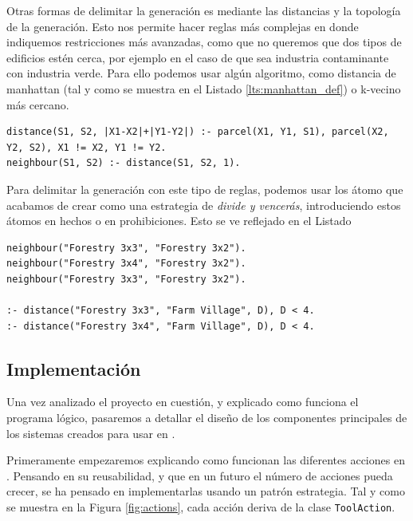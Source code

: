 Otras formas de delimitar la generación es mediante las distancias y la topología de la generación. Esto nos permite hacer reglas más complejas en donde indiquemos restricciones más avanzadas, como que no queremos que dos tipos de edificios estén cerca, por ejemplo en el caso de que sea industria contaminante con industria verde. Para ello podemos usar algún algoritmo, como distancia de manhattan (tal y como se muestra en el Listado \ref{lts:manhattan_def}) o k-vecino más cercano. \\

\begin{lstlisting}[caption={Cálculo de la distancia del taxista en Aswer Set Programing},captionpos=b,label=lst:manhattan_def]
distance(S1, S2, |X1-X2|+|Y1-Y2|) :- parcel(X1, Y1, S1), parcel(X2, Y2, S2), X1 != X2, Y1 != Y2.
neighbour(S1, S2) :- distance(S1, S2, 1).
\end{lstlisting}

Para delimitar la generación con este tipo de reglas, podemos usar los átomo que acabamos de crear como una estrategia de \textit{divide y vencerás}, introduciendo estos átomos en hechos o en prohibiciones. Esto se ve reflejado en el Listado

\begin{lstlisting}[caption={Prohibiciones de generación de edificios},captionpos=b,label=lst:distance_rules]
neighbour("Forestry 3x3", "Forestry 3x2").
neighbour("Forestry 3x4", "Forestry 3x2").
neighbour("Forestry 3x3", "Forestry 3x2").

:- distance("Forestry 3x3", "Farm Village", D), D < 4.
:- distance("Forestry 3x4", "Farm Village", D), D < 4.
\end{lstlisting}

\subsection{Implementación}
\label{subsec:implementacion}

Una vez analizado el proyecto en cuestión, y explicado como funciona el programa lógico, pasaremos a detallar el diseño de los componentes principales de los sistemas creados para usar en \cities.

Primeramente empezaremos explicando como funcionan las diferentes acciones en \industrylp. Pensando en su reusabilidad, y que en un futuro el número de acciones pueda crecer, se ha pensado en implementarlas usando un patrón estrategia. Tal y como se muestra en la Figura \ref{fig:actions}, cada acción deriva de la clase \texttt{ToolAction}.

